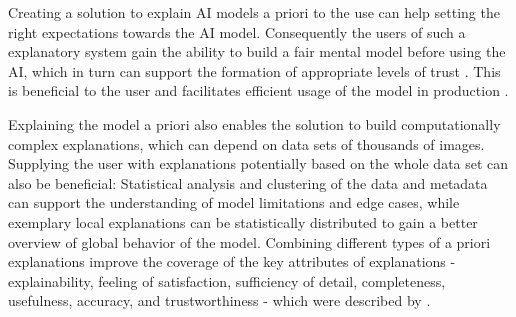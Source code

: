 \documentclass[11pt,a4paper,english]{scrreprt}
\begin{document}
Creating a solution to explain AI models a priori to the use can help setting the right expectations towards the AI model. Consequently the users of such a explanatory system gain the ability to build a fair mental model before using the AI, which in turn can support the formation of appropriate levels of trust \parencite{hoffman_metrics_2019}. This is beneficial to the user and facilitates efficient usage of the model in production \parencite{hoffman_metrics_2019, people_ai_google_website}.

Explaining the model a priori also enables the solution to build computationally complex explanations, which can depend on data sets of thousands of images. Supplying the user with explanations potentially based on the whole data set can also be beneficial: Statistical analysis and clustering of the data and metadata can support the understanding of model limitations and edge cases, while exemplary local explanations can be statistically distributed to gain a better overview of global behavior of the model. Combining different types of a priori explanations improve the coverage of the key attributes of explanations - explainability, feeling of satisfaction, sufficiency of detail, completeness, usefulness, accuracy, and trustworthiness - which were described by \textcite{hoffman_metrics_2019}.
\end{document}
